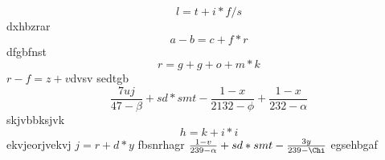 $$l=t+i*f/s$$
dxhbzrar
$$a-b=c+f*r$$
dfgbfnst
\begin{equation}r=g+g+o+m*k\end{equation}
\(r-f=z+v\)dvsv
sedtgb
\begin{equation}\frac{7uj}{47 - \beta} + sd*smt -\frac{1 - x}{2132 - \phi} + \frac{1 - x}{232 - \alpha}\end{equation}
skjvbbksjvk $$h=k+i*i$$ ekvjeorjvekvj
$j=r+d*y$
fbsnrhagr
$\frac{1 - v}{239 - \alpha} + sd*smt -\frac{3y}{239 - \Chi}$
egsehbgaf

\documentclass[11pt]{article}
\usepackage{lipsum}

\begin{center}
\Large{
\LaTeX{} example by Uspenkiy A., group 202}
\end{center}
\lipsum[1]
$x = a + b - c$

\lipsum[2]
$$y = ab + c^5$$
\lipsum[3]
\begin{equation}
	z =  + \phi
\end{equation}
